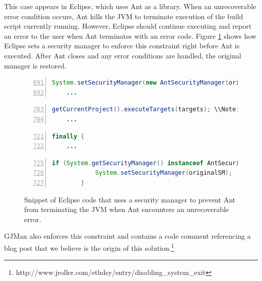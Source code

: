 \documentclass{sig-alternate}
\begin{document}
This case appears in Eclipse, which uses Ant as a library. When an
unrecoverable error condition occurs, Ant kills the JVM to terminate
execution of the build script currently running. However, Eclipse
should continue executing and report an error to the user when Ant
terminates with an error code. Figure \ref{fig:Eclipse-snippet} shows
how Eclipse sets a security manager to enforce this constraint right
before Ant is executed. After Ant closes and any error conditions
are handled, the original manager is restored.

\begin{figure}
\begin{lstlisting}[language=Java,numbers=left,basicstyle={\scriptsize},breaklines=true,firstnumber=691,xrightmargin={0.1cm},numbersep={-10pt}]
    System.setSecurityManager(new AntSecurityManager(originalSM, Thread.currentThread()));
    ...
\end{lstlisting}


\begin{lstlisting}[language=Java,numbers=left,basicstyle={\scriptsize},breaklines=true,firstnumber=703,xrightmargin={0.1cm},numbersep={-10pt}]
    getCurrentProject().executeTargets(targets); \\Note: Ant is executed on this line
    ...
\end{lstlisting}


\begin{lstlisting}[language=Java,numbers=left,basicstyle={\scriptsize},breaklines=true,firstnumber=721,xrightmargin={0.1cm},numbersep={-10pt}]
    finally {
    ...
\end{lstlisting}


\begin{lstlisting}[language=Java,numbers=left,basicstyle={\scriptsize},breaklines=true,firstnumber=725,xrightmargin={0.1cm},numbersep={-10pt}]
        if (System.getSecurityManager() instanceof AntSecurityManager) { 
            System.setSecurityManager(originalSM); 
        }
\end{lstlisting}


\protect\caption{Snippet of Eclipse code that uses a security manager to prevent Ant
from terminating the JVM when Ant encounters an unrecoverable error.}\label{fig:Eclipse-snippet}
\end{figure}

GJMan also enforces this constraint and contains a code comment referencing a
blog post that we believe is the origin of this solution.\footnote{http://www.jroller.com/ethdsy/entry/disabling\_system\_exit} 
\end{document}
